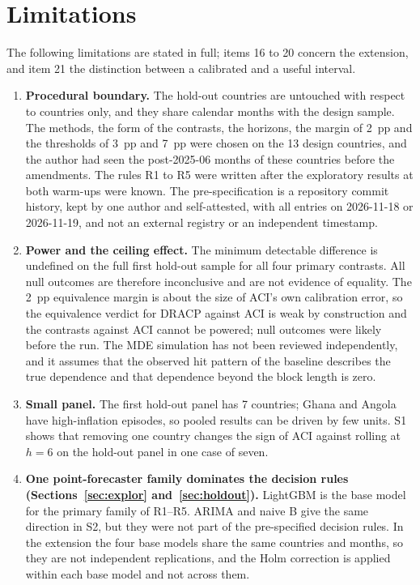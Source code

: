 \section{Limitations}\label{sec:limitations}

The following limitations are stated in full; items 16 to 20 concern the extension, and item 21 the distinction between a calibrated and a useful interval.

\begin{enumerate}
\item \textbf{Procedural boundary.} The hold-out countries are untouched with respect to countries only, and they share calendar months with the design sample. The methods, the form of the contrasts, the horizons, the margin of 2~pp and the thresholds of 3~pp and 7~pp were chosen on the 13 design countries, and the author had seen the post-2025-06 months of these countries before the amendments. The rules R1 to R5 were written after the exploratory results at both warm-ups were known. The pre-specification is a repository commit history, kept by one author and self-attested, with all entries on 2026-11-18 or 2026-11-19, and not an external registry or an independent timestamp.
\item \textbf{Power and the ceiling effect.} The minimum detectable difference is undefined on the full first hold-out sample for all four primary contrasts. All null outcomes are therefore inconclusive and are not evidence of equality. The 2~pp equivalence margin is about the size of ACI's own calibration error, so the equivalence verdict for DRACP against ACI is weak by construction and the contrasts against ACI cannot be powered; null outcomes were likely before the run. The MDE simulation has not been reviewed independently, and it assumes that the observed hit pattern of the baseline describes the true dependence and that dependence beyond the block length is zero.
\item \textbf{Small panel.} The first hold-out panel has 7 countries; Ghana and Angola have high-inflation episodes, so pooled results can be driven by few units. S1 shows that removing one country changes the sign of ACI against rolling at $h=6$ on the hold-out panel in one case of seven.
\item \textbf{One point-forecaster family dominates the decision rules (Sections~\ref{sec:explor} and~\ref{sec:holdout}).} LightGBM is the base model for the primary family of R1--R5. ARIMA and naive B give the same direction in S2, but they were not part of the pre-specified decision rules. In the extension the four base models share the same countries and months, so they are not independent replications, and the Holm correction is applied within each base model and not across them.

\end{enumerate}
